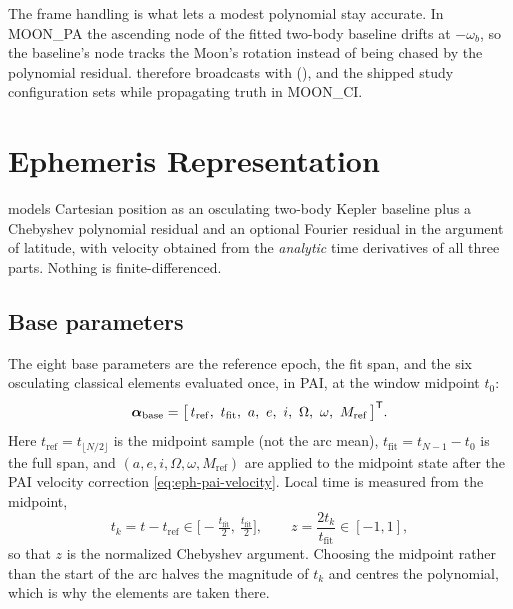 \begin{lupntnote}
  The frame handling is what lets a modest polynomial stay accurate. In
  MOON\_PA the ascending node of the fitted two-body baseline drifts at
  $-\omega_b$, so the baseline's node tracks the Moon's rotation instead of
  being chased by the polynomial residual.  therefore
  broadcasts with 
  (), and the
  shipped study configuration  sets
   while propagating truth in MOON\_CI.
\end{lupntnote}

\section{Ephemeris Representation}
\label{sec:eph-representation}

 \citep[\S7.2, Algorithm~3]{iiyama2026thesis} models
Cartesian position as an osculating two-body Kepler baseline plus a Chebyshev
polynomial residual and an optional Fourier residual in the argument of
latitude, with velocity obtained from the \emph{analytic} time derivatives of
all three parts. Nothing is finite-differenced.

\subsection{Base parameters}

The eight base parameters are the reference epoch, the fit span, and the six
osculating classical elements evaluated once, in PAI, at the window midpoint
$t_0$:
\begin{equation}
  \label{eq:eph-base-params}
  \vec{\alpha}_\mathrm{base} =
  \big[\,t_\mathrm{ref},\ t_\mathrm{fit},\ a,\ e,\ i,\ \Omega,\ \omega,\ M_\mathrm{ref}\,\big]\transpose .
\end{equation}
Here $t_\mathrm{ref} = t_{\lfloor N/2\rfloor}$ is the midpoint sample (not the
arc mean), $t_\mathrm{fit} = t_{N-1} - t_0$ is the full span, and
$(a,e,i,\Omega,\omega,M_\mathrm{ref})$ are  applied to the
midpoint state after the PAI velocity correction \cref{eq:eph-pai-velocity}.
Local time is measured from the midpoint,
\begin{equation}
  \label{eq:eph-tk}
  t_k = t - t_\mathrm{ref} \in \Big[-\tfrac{t_\mathrm{fit}}{2},\ \tfrac{t_\mathrm{fit}}{2}\Big],
  \qquad
  z = \frac{2t_k}{t_\mathrm{fit}} \in [-1, 1],
\end{equation}
so that $z$ is the normalized Chebyshev argument. Choosing the midpoint rather
than the start of the arc halves the magnitude of $t_k$ and centres the
polynomial, which is why the elements are taken there.

